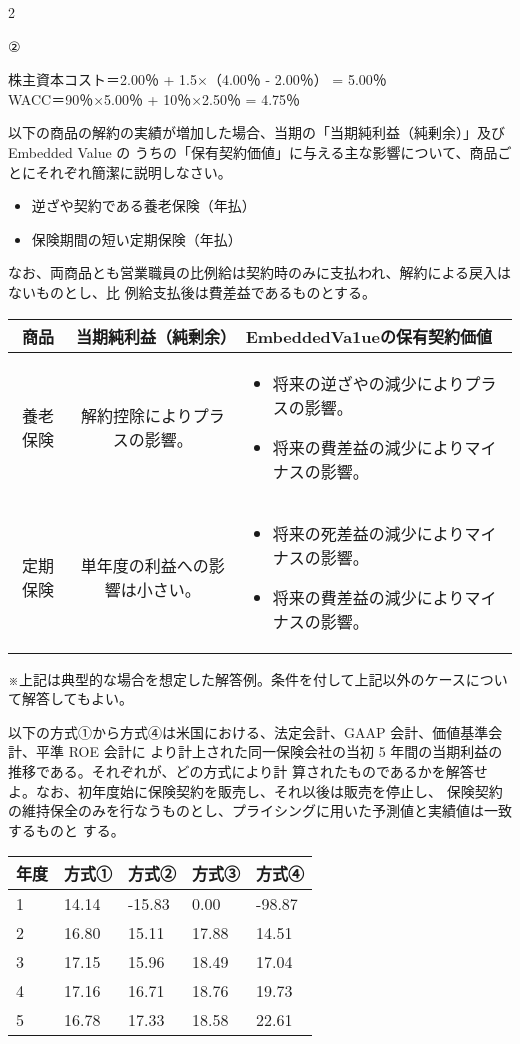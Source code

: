 2\documentclass[report,gutter=10mm,fore-edge=10mm,uplatex,dvipdfmx]{jlreq}
\begin{document}
②

株主資本コスト＝2.00％ + 1.5×（4.00％ - 2.00％） = 5.00％\\
WACC＝90％×5.00％ + 10％×2.50％ = 4.75％

以下の商品の解約の実績が増加した場合、当期の「当期純利益（純剰余）」及び Embedded Value の
うちの「保有契約価値」に与える主な影響について、商品ごとにそれぞれ簡潔に説明しなさい。
\begin{itemize}
\item[] 逆ざや契約である養老保険（年払）
\item[] 保険期間の短い定期保険（年払）
\end{itemize}
なお、両商品とも営業職員の比例給は契約時のみに支払われ、解約による戻入はないものとし、比
例給支払後は費差益であるものとする。
\answer{}

 \begin{tabular}{|c|c|p{}|}
 \hline{}
商品&当期純利益（純剰余）& EmbeddedVa1ueの保有契約価値\\  \hline{}
養老保険&解約控除によりプラスの影響。&
\begin{itemize}
\item[] 将来の逆ざやの減少によりプラスの影響。
\item[] 将来の費差益の減少によりマイナスの影響。
\end{itemize}\\ \hline{}
定期保険& 
単年度の利益への影響は小さい。& 
\begin{itemize}
\item[]  将来の死差益の減少によりマイナスの影響。
\item[]  将来の費差益の減少によりマイナスの影響。
\end{itemize} \\
\hline
\end{tabular}

※上記は典型的な場合を想定した解答例。条件を付して上記以外のケースについて解答してもよい。

以下の方式①から方式④は米国における、法定会計、GAAP 会計、価値基準会計、平準 ROE 会計に
より計上された同一保険会社の当初 5 年間の当期利益の推移である。それぞれが、どの方式により計
算されたものであるかを解答せよ。なお、初年度始に保険契約を販売し、それ以後は販売を停止し、
保険契約の維持保全のみを行なうものとし、プライシングに用いた予測値と実績値は一致するものと
する。

\begin{tabular}{lllll}
年度&方式①&方式②&方式③&方式④\\ \hline
1&14.14&-15.83&0.00&-98.87\\
2&16.80&15.11&17.88&14.51\\
3&17.15&15.96&18.49&17.04\\
4&17.16&16.71&18.76&19.73\\
5&16.78&17.33&18.58&22.61\\
\end{tabular}
\answer{}
\end{document}
